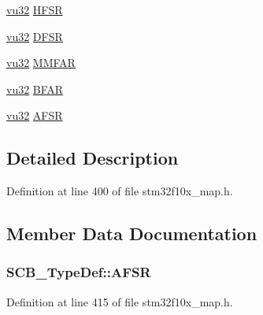 \begin{DoxyCompactItemize}
\item 
\hyperlink{agilefox_2library_2inc_2stm32f10x__type_8h_a6e2761f0a1011f84ed96b946f2c8a563}{vu32} \hyperlink{struct_s_c_b___type_def_a409abf8bf83a27ddbf4bb02a824cd683}{H\+F\+SR}
\item 
\hyperlink{agilefox_2library_2inc_2stm32f10x__type_8h_a6e2761f0a1011f84ed96b946f2c8a563}{vu32} \hyperlink{struct_s_c_b___type_def_aa65ab0c1b8f69d60734e45dd47b42905}{D\+F\+SR}
\item 
\hyperlink{agilefox_2library_2inc_2stm32f10x__type_8h_a6e2761f0a1011f84ed96b946f2c8a563}{vu32} \hyperlink{struct_s_c_b___type_def_a5f569314b5438b50ebc6c2f5397c5fa1}{M\+M\+F\+AR}
\item 
\hyperlink{agilefox_2library_2inc_2stm32f10x__type_8h_a6e2761f0a1011f84ed96b946f2c8a563}{vu32} \hyperlink{struct_s_c_b___type_def_a17db96ee7ae775af8899594d19c822de}{B\+F\+AR}
\item 
\hyperlink{agilefox_2library_2inc_2stm32f10x__type_8h_a6e2761f0a1011f84ed96b946f2c8a563}{vu32} \hyperlink{struct_s_c_b___type_def_a010d336f3b888ad79ab4ef4133bbf4bc}{A\+F\+SR}
\end{DoxyCompactItemize}


\subsection{Detailed Description}


Definition at line 400 of file stm32f10x\+\_\+map.\+h.



\subsection{Member Data Documentation}
\subsubsection[{\texorpdfstring{A\+F\+SR}{AFSR}}]{ S\+C\+B\+\_\+\+Type\+Def\+::\+A\+F\+SR}\hypertarget{struct_s_c_b___type_def_a010d336f3b888ad79ab4ef4133bbf4bc}{}\label{struct_s_c_b___type_def_a010d336f3b888ad79ab4ef4133bbf4bc}


Definition at line 415 of file stm32f10x\+\_\+map.\+h.

